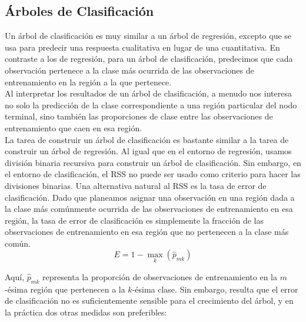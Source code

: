 \subsection{Árboles de Clasificación}

Un árbol de clasificación es muy similar a un árbol de regresión, excepto que se usa para predecir una respuesta cualitativa en lugar de una cuantitativa. En contraste a los de regresión, para un árbol de clasificación, predecimos que cada observación pertenece a la clase más ocurrida de las observaciones de entrenamiento en la región a la que pertenece. \\

Al interpretar los resultados de un árbol de clasificación, a menudo nos interesa no solo la predicción de la clase correspondiente a una región particular del nodo terminal, sino también las proporciones de clase entre las observaciones de entrenamiento que caen en esa región. \\

La tarea de construir un árbol de clasificación es bastante similar a la tarea de construir un árbol de regresión. Al igual que en el entorno de regresión, usamos división binaria recursiva para construir un árbol de clasificación. Sin embargo, en el entorno de clasificación, el RSS no puede ser usado como criterio para hacer las divisiones binarias. Una alternativa natural al RSS es la tasa de error de clasificación. Dado que planeamos asignar una observación en una región dada a la clase más comúnmente ocurrida de las observaciones de entrenamiento en esa región, la tasa de error de clasificación es simplemente la fracción de las observaciones de entrenamiento en esa región que no pertenecen a la clase más común.
\begin{equation}
E = 1 - \max_k (\hat{p}_{mk})
\end{equation}

Aquí, $\hat{p}_{mk}$ representa la proporción de observaciones de entrenamiento en la $m$-ésima región que pertenecen a la $k$-ésima clase. Sin embargo, resulta que el error de clasificación no es suficientemente sensible para el crecimiento del árbol, y en la práctica dos otras medidas son preferibles: 

